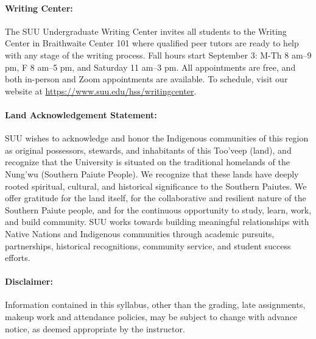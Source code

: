 \documentclass[12pt, letterpaper]{article}
\begin{document}
\paragraph{Writing Center:}
The SUU Undergraduate Writing Center invites all students to the Writing Center in Braithwaite Center 101 where qualified peer tutors are ready to help with any stage of the writing process. Fall hours start September 3: M-Th 8 am–9 pm, F 8 am–5 pm, and Saturday 11 am–3 pm. All appointments are free, and both in-person and Zoom appointments are available. To schedule, visit our website at \href{https://www.suu.edu/hss/writingcenter}{https://www.suu.edu/hss/writingcenter}.

\paragraph{Land Acknowledgement Statement:}
SUU wishes to acknowledge and honor the Indigenous communities of this region as original possessors, stewards, and inhabitants of this Too’veep (land), and recognize that the University is situated on the traditional homelands of the Nung’wu (Southern Paiute People). We recognize that these lands have deeply rooted spiritual, cultural, and historical significance to the Southern Paiutes. We offer gratitude for the land itself, for the collaborative and resilient nature of the Southern Paiute people, and for the continuous opportunity to study, learn, work, and build community. SUU works towards building meaningful relationships with Native Nations and Indigenous communities through academic pursuits, partnerships, historical recognitions, community service, and student success efforts.

\paragraph{Disclaimer:}
Information contained in this syllabus, other than the grading, late assignments, makeup work and attendance policies, may be subject to change with advance notice, as deemed appropriate by the instructor.
\end{document}
